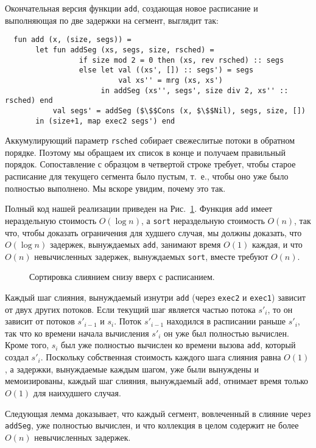 Окончательная версия функции \lstinline!add!, создающая новое
расписание и выполняющая по две задержки на сегмент, выглядит так:
\begin{lstlisting}
  fun add (x, (size, segs)) =
       let fun addSeg (xs, segs, size, rsched) =
                 if size mod 2 = 0 then (xs, rev rsched) :: segs
                 else let val ((xs', []) :: segs') = segs
                          val xs'' = mrg (xs, xs')
                      in addSeg (xs'', segs', size div 2, xs'' :: rsched) end
           val segs' = addSeg ($\$$Cons (x, $\$$Nil), segs, size, [])
       in (size+1, map exec2 segs') end
\end{lstlisting}
Аккумулирующий параметр \lstinline!rsched! собирает свежеслитые потоки
в обратном порядке. Поэтому мы обращаем их список в конце и
получаем правильный порядок. Сопоставление с образцом в четвертой
строке требует, чтобы старое расписание для текущего сегмента было
пустым, т.~е., чтобы оно уже было полностью выполнено. Мы вскоре
увидим, почему это так.

Полный код нашей реализации приведен на Рис.~\ref{fig:7.3}. Функция
\lstinline!add! имеет нераздельную стоимость $O(\log n)$, а
\lstinline!sort! нераздельную стоимость $O(n)$, так что, чтобы
доказать ограничения для худшего случая, мы должны доказать, что
$O(\log n)$ задержек, вынуждаемых \lstinline!add!, занимают время
$O(1)$ каждая, и что $O(n)$ невычисленных задержек, вынуждаемых
\lstinline!sort!, вместе требуют $O(n)$.

\begin{figure}
  \centering
  
  \caption{Сортировка слиянием снизу вверх с расписанием.}
  \label{fig:7.3}
\end{figure}

Каждый шаг слияния, вынуждаемый изнутри \lstinline!add! (через
\lstinline!exec2! и \lstinline!exec1!) зависит от двух других
потоков. Если текущий шаг является частью потока $s'_i$, то он зависит
от потоков $s'_{i-1}$ и $s_i$. Поток $s'_{i-1}$ находился в расписании
раньше $s'_i$, так что ко времени начала вычисления $s'_i$ он уже был
полностью вычислен. Кроме того, $s_i$ был уже полностью вычислен ко
времени вызова \lstinline!add!, который создал $s'_i$. Поскольку
собственная стоимость каждого шага слияния равна $O(1)$, а задержки,
вынуждаемые каждым шагом, уже были вынуждены и мемоизированы, каждый
шаг слияния, вынуждаемый \lstinline!add!, отнимает время только $O(1)$
для наихудшего случая.

Следующая лемма доказывает, что каждый сегмент, вовлеченный в слияние
через \lstinline!addSeg!, уже полностью вычислен, и что коллекция в
целом содержит не более $O(n)$ невычисленных задержек.

